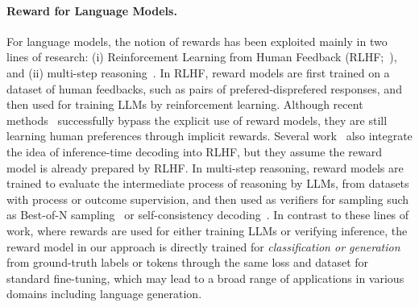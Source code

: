 \paragraph{Reward for Language Models.}
For language models, the notion of rewards has been exploited mainly in two lines of research: (i) Reinforcement Learning from Human Feedback (RLHF;~\citet{christiano2017deep,jaques2017sequence,ouyang2022training}), and (ii) multi-step reasoning~\citep{cobbe2021training,uesato2022solving}.
In RLHF, reward models are first trained on a dataset of human feedbacks, such as pairs of prefered-disprefered responses, and then used for training LLMs by reinforcement learning.
Although recent methods~\citep{rafailov2024direct,calandriello24humanalignment,ethayarajh24modelalignment,rafailov2024from} successfully bypass the explicit use of reward models, they are still learning human preferences through implicit rewards.
Several work~\cite{liu2024decoding,chakraborty2024transferqstar,khanov2024args} also integrate the idea of inference-time decoding into RLHF, but they assume the reward model is already prepared by RLHF.
In multi-step reasoning, reward models are trained to evaluate the intermediate process of reasoning by LLMs, from datasets with process or outcome supervision, and then used as verifiers for sampling such as Best-of-N sampling~\citep{lightman2024lets_verify,wang2024math} or self-consistency decoding~\citep{wang2023selfconsistency,luo2024improve}.
In contrast to these lines of work, where rewards are used for either training LLMs or verifying inference, the reward model in our approach is directly trained for {\it classification or generation} from ground-truth labels or tokens through the same loss and dataset for standard fine-tuning, which may lead to a broad range of applications in various domains including language generation.